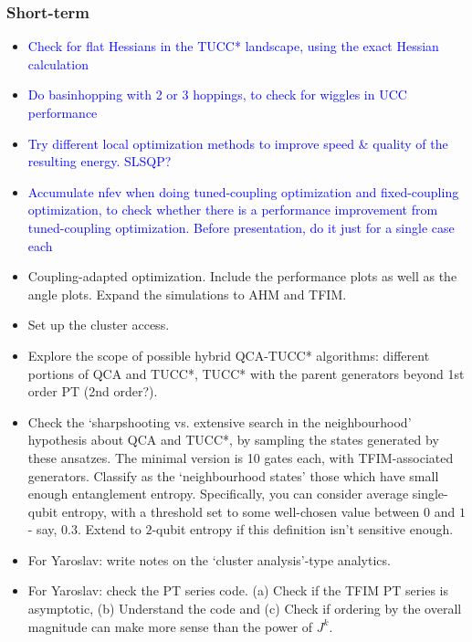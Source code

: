 \documentclass[10pt, a4paper]{article}
\def\blue{\textcolor{blue}}
\begin{document}
\subsubsection*{Short-term}
\begin{itemize}

\item \blue{Check for flat Hessians in the TUCC* landscape, using the exact Hessian calculation}

\item \blue{Do basinhopping with 2 or 3 hoppings, to check for wiggles in UCC performance}

\item \blue{Try different local optimization methods to improve speed \& quality of the resulting energy. SLSQP?}

\item \blue{Accumulate nfev when doing tuned-coupling optimization and fixed-coupling optimization, to check whether there is a performance improvement from tuned-coupling optimization. Before presentation, do it just for a single case each}

\item Coupling-adapted optimization. Include the performance plots as well as the angle plots. Expand the simulations to AHM and TFIM.

\item Set up the cluster access.

\item Explore the scope of possible hybrid QCA-TUCC* algorithms: different portions of QCA and TUCC*, TUCC* with the parent generators beyond 1st order PT (2nd order?). 

\item Check the `sharpshooting vs. extensive search in the neighbourhood' hypothesis about QCA and TUCC*, by sampling the states generated by these ansatzes. The minimal version is 10 gates each, with TFIM-associated generators. Classify as the `neighbourhood states' those which have small enough entanglement entropy. Specifically, you can consider average single-qubit entropy, with a threshold set to some well-chosen value between $0$ and $1$ - say, $0.3$. Extend to $2$-qubit entropy if this definition isn't sensitive enough.

\item For Yaroslav: write notes on the `cluster analysis'-type analytics.

\item For Yaroslav: check the PT series code. (a) Check if the TFIM PT series is asymptotic, (b) Understand the code and (c) Check if ordering by the overall magnitude can make more sense than the power of $J^k$.

\end{itemize}
\end{document}
